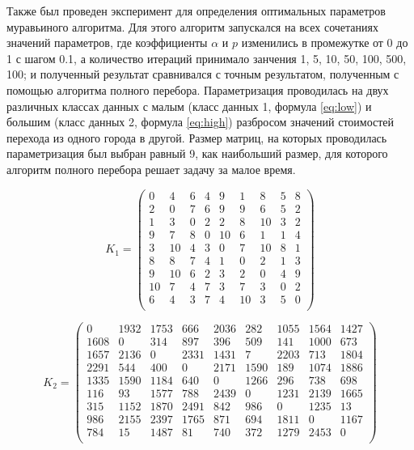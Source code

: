 Также был проведен эксперимент для определения оптимальных параметров
муравьиного алгоритма. Для этого алгоритм запускался на всех сочетаниях
значений параметров, где коэффициенты $\alpha$ и $p$ изменились в промежутке от
0 до 1 с шагом 0.1, а количество итераций принимало занчения 1, 5, 10, 50, 100,
500, 100; и полученный результат сравнивался с точным результатом, полученным
с помощью алгоритма полного перебора. Параметризация проводилась на двух
различных классах данных с малым (класс данных 1, формула \ref{eq:low}) и
большим (класс данных 2, формула \ref{eq:high}) разбросом значений стоимостей
перехода из одного города в другой. Размер матриц, на которых проводилась
параметризация был выбран равный 9, как наибольший размер, для которого
алгоритм полного перебора решает задачу за малое время.

\begin{equation}
    \label{eq:low}
	K_{1} = \begin{pmatrix}
        0  &  4  & 6 &  4 &  9  &  1  &  8  & 5 &  8\\
        2  &  0  & 7 &  6 &  9  &  9  &  6  & 5 &  2\\
        1  &  3  & 0 &  2 &  2  &  8  &  10 & 3 &  2\\
        9  &  7  & 8 &  0 &  10 &  6  &  1  & 1 &  4\\
        3  &  10 & 4 &  3 &  0  &  7  &  10 & 8 &  1\\
        8  &  8  & 7 &  4 &  1  &  0  &  2  & 1 &  3\\
        9  &  10 & 6 &  2 &  3  &  2  &  0  & 4 &  9\\
        10 &  7  & 4 &  7 &  3  &  7  &  3  & 0 &  2\\
        6  &  4  & 3 &  7 &  4  &  10 &  3  & 5 &  0\\
            \end{pmatrix}
\end{equation}

\begin{equation}
    \label{eq:high}
	K_{2} = \begin{pmatrix}
        0    & 1932 & 1753 & 666  & 2036 & 282  & 1055 & 1564 & 1427\\
        1608 & 0    & 314  & 897  & 396  & 509  & 141  & 1000 & 673 \\
        1657 & 2136 & 0    & 2331 & 1431 & 7    & 2203 & 713  & 1804\\
        2291 & 544  & 400  & 0    & 2171 & 1590 & 189  & 1074 & 1886\\
        1335 & 1590 & 1184 & 640  & 0    & 1266 & 296  & 738  & 698 \\
        116  & 93   & 1577 & 788  & 2439 & 0    & 1231 & 2139 & 1665\\
        315  & 1152 & 1870 & 2491 & 842  & 986  & 0    & 1235 & 13  \\
        986  & 2155 & 2397 & 1765 & 871  & 694  & 1811 & 0    & 1167\\
        784  & 15   & 1487 & 81   & 740  & 372  & 1279 & 2453 & 0   \\
	        \end{pmatrix}
\end{equation}


